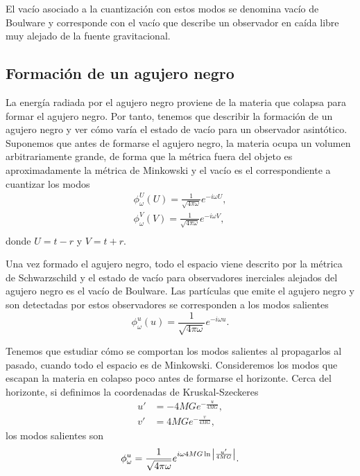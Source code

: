 El vacío asociado a la cuantización con estos modos se denomina vacío de Boulware y 
corresponde con el vacío que describe un observador en caída libre muy alejado de la fuente
gravitacional.

\subsection{Formación de un agujero negro}

La energía radiada por el agujero negro proviene de la materia que colapsa para formar el agujero negro.
Por tanto, tenemos que describir la formación de un agujero negro y ver cómo varía el estado de vacío
para un observador asintótico.
Suponemos que antes de formarse el agujero negro, la materia ocupa un volumen arbitrariamente grande,
de forma que la métrica fuera del objeto es aproximadamente la métrica de Minkowski y el vacío es el correspondiente
a cuantizar los modos
\begin{equation}
  \begin{gathered}
    \phi_\omega^U (U)=\frac{1}{\sqrt{4\pi\omega}} e^{-i\omega U},\\
    \phi_\omega^V (V)=\frac{1}{\sqrt{4\pi\omega}} e^{-i\omega V},\\
  \end{gathered}
\end{equation}
donde $U=t-r$ y $V=t+r$.

Una vez formado el agujero negro, todo el espacio viene descrito por la métrica de Schwarzschild y
el estado de vacío para observadores inerciales alejados del agujero negro es el vacío de Boulware.
Las partículas que emite el agujero negro y son detectadas por estos observadores se corresponden a los
modos salientes
\begin{equation}
  \phi^u_\omega(u) = \frac{1}{\sqrt{4\pi \omega}}e^{-i\omega u}.
\end{equation}

Tenemos que estudiar cómo se comportan los modos salientes al propagarlos al pasado, cuando todo
el espacio es de Minkowski.
Consideremos los modos que escapan la materia en colapso poco antes de formarse el horizonte.
Cerca del horizonte, si definimos la coordenadas de Kruskal-Szeckeres
\begin{equation}
  \begin{aligned}
    u'&=-4MGe^{-\frac{u}{4MG}},\\
    v'&=4MGe^{-\frac{v}{4MG}},
  \end{aligned}
\end{equation}
los modos salientes son
\begin{equation}
  \phi^{u}_\omega = \frac{1}{\sqrt{4\pi\omega}}e^{i\omega 4MG\ln \abs{\frac{u'}{4MG}}}.
\end{equation}

